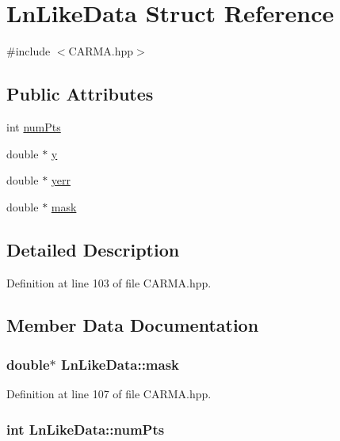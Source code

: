 \hypertarget{struct_ln_like_data}{\section{Ln\-Like\-Data Struct Reference}
\label{struct_ln_like_data}
}


{\ttfamily \#include $<$C\-A\-R\-M\-A.\-hpp$>$}

\subsection*{Public Attributes}
\begin{DoxyCompactItemize}
\item 
int \hyperlink{struct_ln_like_data_a06edae26098d8ccd31a18fa0995fed86}{num\-Pts}
\item 
double $\ast$ \hyperlink{struct_ln_like_data_ac75cc1e68fffac23d841e09f927a0a53}{y}
\item 
double $\ast$ \hyperlink{struct_ln_like_data_a54330ef049f623a902d04f58e5aee208}{yerr}
\item 
double $\ast$ \hyperlink{struct_ln_like_data_a51c6e3bd71666d529910318735f0df21}{mask}
\end{DoxyCompactItemize}


\subsection{Detailed Description}


Definition at line 103 of file C\-A\-R\-M\-A.\-hpp.



\subsection{Member Data Documentation}
\hypertarget{struct_ln_like_data_a51c6e3bd71666d529910318735f0df21}{
\subsubsection[{mask}]{\setlength{\rightskip}{0pt plus 5cm}double$\ast$ Ln\-Like\-Data\-::mask}}\label{struct_ln_like_data_a51c6e3bd71666d529910318735f0df21}


Definition at line 107 of file C\-A\-R\-M\-A.\-hpp.

\hypertarget{struct_ln_like_data_a06edae26098d8ccd31a18fa0995fed86}{
\subsubsection[{num\-Pts}]{\setlength{\rightskip}{0pt plus 5cm}int Ln\-Like\-Data\-::num\-Pts}}\label{struct_ln_like_data_a06edae26098d8ccd31a18fa0995fed86}


